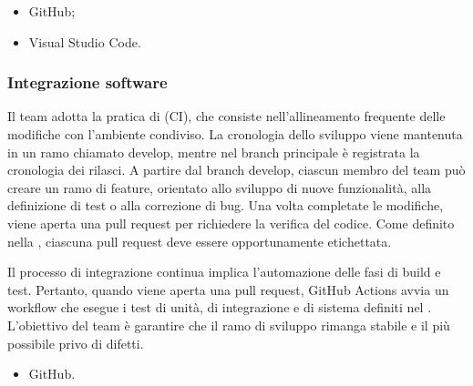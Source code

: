 \IntroStrumenti
\begin{itemize}
  \item GitHub;
  \item Visual Studio Code.
\end{itemize}

\subsubsection{Integrazione software}
\par Il team adotta la pratica di  (CI), che consiste nell'allineamento frequente delle modifiche con l’ambiente condiviso. La cronologia dello sviluppo viene mantenuta in un ramo chiamato develop, mentre nel branch principale è registrata la cronologia dei rilasci. A partire dal branch develop, ciascun membro del team può creare un ramo di feature, orientato allo sviluppo di nuove funzionalità, alla definizione di test o alla correzione di bug. Una volta completate le modifiche, viene aperta una pull request per richiedere la verifica del codice. Come definito nella , ciascuna pull request deve essere opportunamente etichettata.

\par Il processo di integrazione continua implica l'automazione delle fasi di build e test. Pertanto, quando viene aperta una pull request, GitHub Actions avvia un workflow che esegue i test di unità, di integrazione e di sistema definiti nel \PianoDiQualifica. L’obiettivo del team è garantire che il ramo di sviluppo rimanga stabile e il più possibile privo di difetti.

\IntroStrumenti
\begin{itemize}
  \item GitHub.
\end{itemize}

